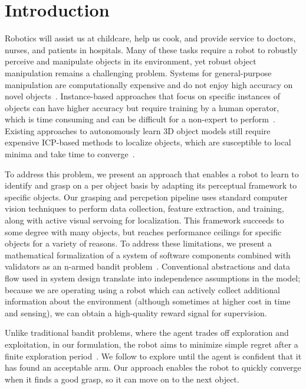 \documentclass{article}
\begin{document}
\section{Introduction}
Robotics will assist us at childcare, help us cook, and
provide service to doctors, nurses, and patients in hospitals. Many of
these tasks require a robot to robustly perceive and manipulate
objects in its environment, yet robust object manipulation remains a
challenging problem.  Systems for general-purpose manipulation are
computationally expensive and do not enjoy high accuracy on novel
objects~\citep{saxena08}.  Instance-based approaches that focus on
specific instances of objects can have higher accuracy but require
training by a human operator, which is time consuming and can be
difficult for a non-expert to perform~\citep{ork14, lai11, lai11a}.
Existing approaches to autonomously learn 3D object models still
require expensive ICP-based methods to localize objects, which are
susceptible to local minima and take time to
converge~\citep{krainin11}.

To address this problem, we present an approach that enables a robot
to learn to identify and grasp on a per object basis by adapting its
perceptual framework to specific objects. Our grasping and percpetion
pipeline uses standard computer vision techniques to perform data
collection, feature extraction, and training, along with active visual
servoing for localization.  This framework succeeds to some degree with
many objects, but reaches performance ceilings for specific objects
for a variety of reasons.  To address these limitations, we present a
mathematical formalization of a system of software components combined
with validators as an n-armed bandit problem~\citep{thompson33}.
Conventional abstractions and data flow used in system design
translate into independence assumptions in the model; because we are
operating using a robot which can actively collect additional
information about the environment (although sometimes at higher cost
in time and sensing), we can obtain a high-quality reward signal for
supervision.  

Unlike traditional bandit problems, where the agent trades off
exploration and exploitation, in our formulation, the robot aims to
minimize simple regret after a finite exploration
period~\citep{bubeck09}.  We follow \citet{maron93} to explore until
the agent is confident that it has found an acceptable arm.  Our
approach enables the robot to quickly converge when it finds a good
grasp, so it can move on to the next object.
\end{document}
